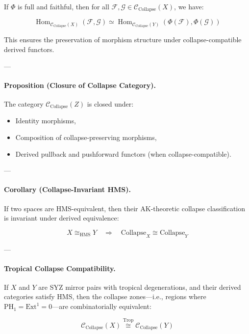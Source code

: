\documentclass[11pt]{article}
\begin{document}
\begin{axiom}
\begin{axiom}
{{If \( \Phi \) is full and faithful, then for all \( \mathcal{F}, \mathcal{G} \in \mathcal{C}_{\text{Collapse}}(X) \), we have:

\[
\operatorname{Hom}_{\mathcal{C}_{\text{Collapse}}(X)}(\mathcal{F}, \mathcal{G})
\simeq
\operatorname{Hom}_{\mathcal{C}_{\text{Collapse}}(Y)}(\Phi(\mathcal{F}), \Phi(\mathcal{G}))
\]

This ensures the preservation of morphism structure under collapse-compatible derived functors.

---

\paragraph{Proposition (Closure of Collapse Category).}

The category \( \mathcal{C}_{\text{Collapse}}(Z) \) is closed under:
\begin{itemize}
  \item Identity morphisms,
  \item Composition of collapse-preserving morphisms,
  \item Derived pullback and pushforward functors (when collapse-compatible).
\end{itemize}

---

\paragraph{Corollary (Collapse-Invariant HMS).}

If two spaces are HMS-equivalent, then their AK-theoretic collapse classification is invariant under derived equivalence:

\[
X \cong_{\mathrm{HMS}} Y \quad \Longrightarrow \quad \mathrm{Collapse}_X \cong \mathrm{Collapse}_Y
\]

---

\paragraph{Tropical Collapse Compatibility.}

If \( X \) and \( Y \) are SYZ mirror pairs with tropical degenerations,  
and their derived categories satisfy HMS, then the collapse zones—i.e.,  
regions where \( \mathrm{PH}_1 = \mathrm{Ext}^1 = 0 \)—are combinatorially equivalent:

\[
\mathcal{C}_{\text{Collapse}}(X) \overset{\mathrm{Trop}}{\cong} \mathcal{C}_{\text{Collapse}}(Y)
\]

}}
\end{axiom}
\end{axiom}
\end{document}
